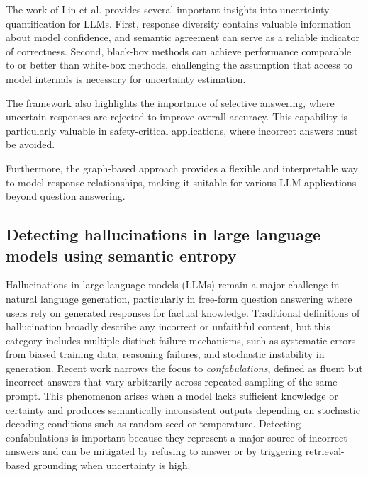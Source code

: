The work of Lin et al. provides several important insights into uncertainty quantification for LLMs. First, response diversity contains valuable information about model confidence, and semantic agreement can serve as a reliable indicator of correctness. Second, black-box methods can achieve performance comparable to or better than white-box methods, challenging the assumption that access to model internals is necessary for uncertainty estimation.

The framework also highlights the importance of selective answering, where uncertain responses are rejected to improve overall accuracy. This capability is particularly valuable in safety-critical applications, where incorrect answers must be avoided.

Furthermore, the graph-based approach provides a flexible and interpretable way to model response relationships, making it suitable for various LLM applications beyond question answering.

\subsection{Detecting hallucinations in large language models using semantic entropy}

Hallucinations in large language models (LLMs) remain a major challenge in natural language generation, particularly in free-form question answering where users rely on generated responses for factual knowledge. Traditional definitions of hallucination broadly describe any incorrect or unfaithful content, but this category includes multiple distinct failure mechanisms, such as systematic errors from biased training data, reasoning failures, and stochastic instability in generation. Recent work narrows the focus to \textit{confabulations}, defined as fluent but incorrect answers that vary arbitrarily across repeated sampling of the same prompt. This phenomenon arises when a model lacks sufficient knowledge or certainty and produces semantically inconsistent outputs depending on stochastic decoding conditions such as random seed or temperature. Detecting confabulations is important because they represent a major source of incorrect answers and can be mitigated by refusing to answer or by triggering retrieval-based grounding when uncertainty is high.

